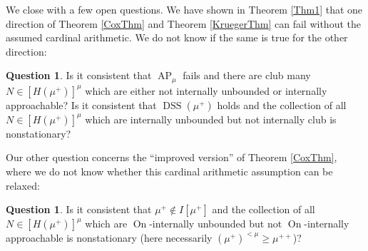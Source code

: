 \documentclass[a4paper]{amsart}
\theoremstyle{definition}
\newtheorem{myque}[mydef]{Question}
\theoremstyle{remark}
\theoremstyle{plain}
\numberwithin{mydef}{section}
\DeclareMathOperator{\AP}{AP}
\DeclareMathOperator{\DSS}{DSS}
\DeclareMathOperator{\On}{On}
\begin{document}
	We close with a few open questions. We have shown in Theorem \ref{Thm1} that one direction of Theorem \ref{CoxThm} and Theorem \ref{KruegerThm} can fail without the assumed cardinal arithmetic. We do not know if the same is true for the other direction:
	
	\begin{myque}
		Is it consistent that $\AP_{\mu}$ fails and there are club many $N\in[H(\mu^+)]^{\mu}$ which are either not internally unbounded or internally approachable? Is it consistent that $\DSS(\mu^+)$ holds and the collection of all $N\in[H(\mu^+)]^{\mu}$ which are internally unbounded but not internally club is nonstationary?
	\end{myque}
	
	Our other question concerns the ``improved version'' of Theorem \ref{CoxThm}, where we do not know whether this cardinal arithmetic assumption can be relaxed:
	
	\begin{myque}
		Is it consistent that $\mu^+\notin I[\mu^+]$ and the collection of all $N\in[H(\mu^+)]^{\mu}$ which are $\On$-internally unbounded but not $\On$-internally approachable is nonstationary (here necessarily $(\mu^+)^{<\mu}\geq\mu^{++}$)?
	\end{myque}
	
	\printbibliography
	
\end{document}

